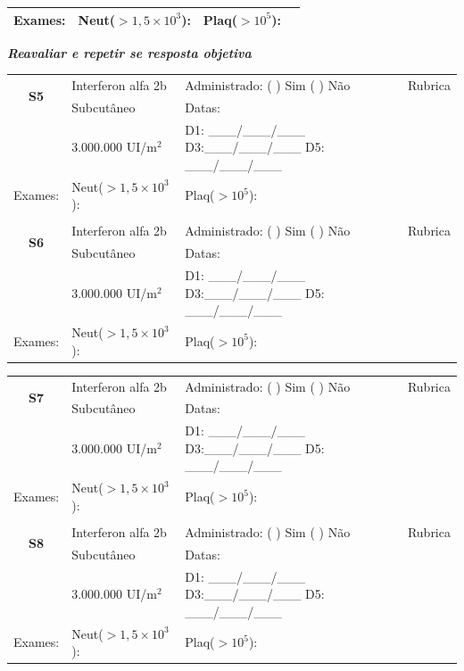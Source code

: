 \documentclass[11pt,a4paper,oldfontcommands]{memoir}
\begin{document}
\begin{center}
\begin{table}[H]
\begin{tabular}{p{1.4cm}p{3.5cm}|p{8cm}|p{1.2cm}}
    \hline
    {Exames:}&{Neut(\(>1,5\times10^3\)):}&{Plaq(\(>10^5\)):}&{}
    \\
    \hline
\end{tabular}
\end{table}
\textbf{\textit{Reavaliar e repetir se resposta objetiva}}
\begin{table}[H]
\begin{tabular}{p{1.4cm}p{3.5cm}|p{8cm}|p{1.2cm}}
    \hline
    \multicolumn{1}{c|}{\multirow{2}{*}{\textbf{S5}}}&{Interferon alfa 2b}&{Administrado: (  ) Sim (  ) Não}&{Rubrica}\\
    \multicolumn{1}{c|}{}&{Subcutâneo}&{Datas:}&\\
    \multicolumn{1}{c|}{}&{3.000.000 UI/m\(^2\)}&{D1: \_\_\_/\_\_\_/\_\_\_ D3:\_\_\_/\_\_\_/\_\_\_ D5: \_\_\_/\_\_\_/\_\_\_}&\\
    \hline
    {Exames:}&{Neut(\(>1,5\times10^3\)):}&{Plaq(\(>10^5\)):}&{}
    \\
    \hline
    \\
    \hline
    \multicolumn{1}{c|}{\multirow{2}{*}{\textbf{S6}}}&{Interferon alfa 2b}&{Administrado: (  ) Sim (  ) Não}&{Rubrica}\\
    \multicolumn{1}{c|}{}&{Subcutâneo}&{Datas:}&\\
    \multicolumn{1}{c|}{}&{3.000.000 UI/m\(^2\)}&{D1: \_\_\_/\_\_\_/\_\_\_ D3:\_\_\_/\_\_\_/\_\_\_ D5: \_\_\_/\_\_\_/\_\_\_}&\\
    \hline
    {Exames:}&{Neut(\(>1,5\times10^3\)):}&{Plaq(\(>10^5\)):}&{}
    \\
    \hline
\end{tabular}
\end{table}
\begin{table}[H]
\begin{tabular}{p{1.4cm}p{3.5cm}|p{8cm}|p{1.2cm}}
    \hline
    \multicolumn{1}{c|}{\multirow{2}{*}{\textbf{S7}}}&{Interferon alfa 2b}&{Administrado: (  ) Sim (  ) Não}&{Rubrica}\\
    \multicolumn{1}{c|}{}&{Subcutâneo }&{Datas:}&\\
    \multicolumn{1}{c|}{}&{3.000.000 UI/m\(^2\)}&{D1: \_\_\_/\_\_\_/\_\_\_ D3:\_\_\_/\_\_\_/\_\_\_ D5: \_\_\_/\_\_\_/\_\_\_}&\\
    \hline
    {Exames:}&{Neut(\(>1,5\times10^3\)):}&{Plaq(\(>10^5\)):}&{}
    \\
    \hline
    \\
    \hline
    \multicolumn{1}{c|}{\multirow{2}{*}{\textbf{S8}}}&{Interferon alfa 2b}&{Administrado: (  ) Sim (  ) Não}&{Rubrica}\\
    \multicolumn{1}{c|}{}&{Subcutâneo}&{Datas:}&\\
    \multicolumn{1}{c|}{}&{3.000.000 UI/m\(^2\)}&{D1: \_\_\_/\_\_\_/\_\_\_ D3:\_\_\_/\_\_\_/\_\_\_ D5: \_\_\_/\_\_\_/\_\_\_}&\\
    \hline
    {Exames:}&{Neut(\(>1,5\times10^3\)):}&{Plaq(\(>10^5\)):}&{}
    \\
    \hline
\end{tabular}
\end{table}
\end{center}
\clearpage
\end{document}
